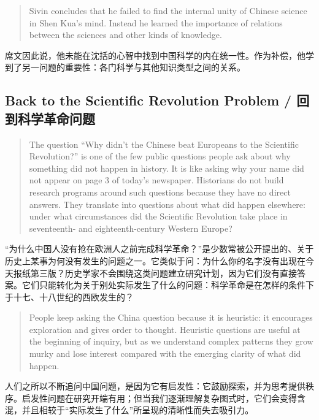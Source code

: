 \documentclass[UTF8,zihao=-4]{ctexart}
\newenvironment{enblock}
  {\par\smallskip\noindent{\scriptsize\bfseries English}\par\begin{quote}\small}
  {\end{quote}}
\newenvironment{zhblock}
  {\par\noindent{\scriptsize\bfseries 中文}\par}
  {\par\medskip}
\begin{document}
\begin{enblock}
Sivin concludes that he failed to find the internal unity of Chinese science in Shen Kua's mind. Instead he learned the importance of relations between the sciences and other kinds of knowledge.
\end{enblock}
\begin{zhblock}
席文因此说，他未能在沈括的心智中找到中国科学的内在统一性。作为补偿，他学到了另一问题的重要性：各门科学与其他知识类型之间的关系。
\end{zhblock}

\subsection*{Back to the Scientific Revolution Problem / 回到科学革命问题}

\begin{enblock}
The question ``Why didn't the Chinese beat Europeans to the Scientific Revolution?'' is one of the few public questions people ask about why something did not happen in history. It is like asking why your name did not appear on page 3 of today's newspaper. Historians do not build research programs around such questions because they have no direct answers. They translate into questions about what did happen elsewhere: under what circumstances did the Scientific Revolution take place in seventeenth- and eighteenth-century Western Europe?
\end{enblock}
\begin{zhblock}
“为什么中国人没有抢在欧洲人之前完成科学革命？”是少数常被公开提出的、关于历史上某事为何没有发生的问题之一。它类似于问：为什么你的名字没有出现在今天报纸第三版？历史学家不会围绕这类问题建立研究计划，因为它们没有直接答案。它们只能转化为关于别处实际发生了什么的问题：科学革命是在怎样的条件下于十七、十八世纪的西欧发生的？
\end{zhblock}

\begin{enblock}
People keep asking the China question because it is heuristic: it encourages exploration and gives order to thought. Heuristic questions are useful at the beginning of inquiry, but as we understand complex patterns they grow murky and lose interest compared with the emerging clarity of what did happen.
\end{enblock}
\begin{zhblock}
人们之所以不断追问中国问题，是因为它有启发性：它鼓励探索，并为思考提供秩序。启发性问题在研究开端有用；但当我们逐渐理解复杂图式时，它们会变得含混，并且相较于“实际发生了什么”所呈现的清晰性而失去吸引力。
\end{zhblock}
\end{document}
